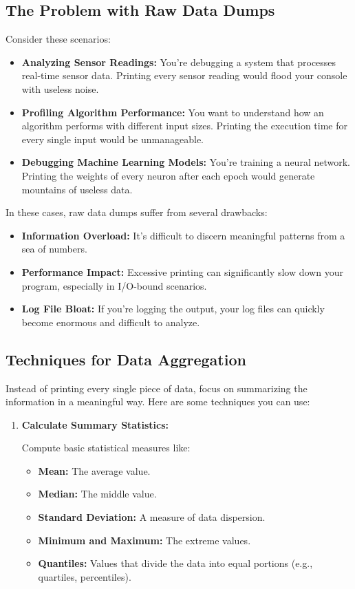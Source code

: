 \documentclass{article}
\begin{document}
{{{\subsection*{The Problem with Raw Data Dumps}

Consider these scenarios:

\begin{itemize}
\item \textbf{Analyzing Sensor Readings:} You're debugging a system that processes real-time sensor data. Printing every sensor reading would flood your console with useless noise.
\item \textbf{Profiling Algorithm Performance:} You want to understand how an algorithm performs with different input sizes. Printing the execution time for every single input would be unmanageable.
\item \textbf{Debugging Machine Learning Models:} You're training a neural network. Printing the weights of every neuron after each epoch would generate mountains of useless data.
\end{itemize}

In these cases, raw data dumps suffer from several drawbacks:

\begin{itemize}
\item \textbf{Information Overload:} It's difficult to discern meaningful patterns from a sea of numbers.
\item \textbf{Performance Impact:} Excessive printing can significantly slow down your program, especially in I/O-bound scenarios.
\item \textbf{Log File Bloat:} If you're logging the output, your log files can quickly become enormous and difficult to analyze.
\end{itemize}

\subsection*{Techniques for Data Aggregation}

Instead of printing every single piece of data, focus on summarizing the information in a meaningful way. Here are some techniques you can use:

\begin{enumerate}
\item \textbf{Calculate Summary Statistics:}

Compute basic statistical measures like:

\begin{itemize}
\item \textbf{Mean:} The average value.
\item \textbf{Median:} The middle value.
\item \textbf{Standard Deviation:} A measure of data dispersion.
\item \textbf{Minimum and Maximum:} The extreme values.
\item \textbf{Quantiles:} Values that divide the data into equal portions (e.g., quartiles, percentiles).
\end{itemize}


\end{enumerate}}}}
\end{document}
